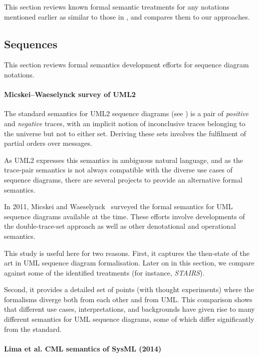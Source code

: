 
This section reviews known formal semantic treatments for any notations
mentioned earlier as similar to those in \langname, and compares them to
our approaches.

\subsection{Sequences}\label{sec:semantics-comparison-review-seq}

This section reviews formal semantics development efforts for sequence diagram
notations.

\paragraph{Micskei--Waeselynck survey of UML2}

The standard semantics for UML2 sequence diagrams (see
\cite[\S 17.2.3.1]{uml251}) is a pair of \emph{positive} and \emph{negative}
traces, with an implicit notion of inconclusive traces belonging to
the universe but not to either set.  Deriving these sets involves the
fulfilment of partial orders over messages.

As UML2 expresses this
semantics in ambiguous natural language, and as the trace-pair
semantics is not always compatible with the diverse use cases of sequence
diagrams, there are several projects to provide an alternative formal semantics.

In 2011, Micskei and Waeselynck~\cite{Micskei11-UMLSeqSemaSurvey} surveyed
the formal semantics for UML sequence diagrams available at the time.  These
efforts involve developments of the double-trace-set approach as well as other
denotational and operational semantics.

This study is useful here for two reasons.  First, it captures the then-state of
the art in UML sequence diagram formalisation.  Later on in this section,
we compare against some of the identified treatments (for instance,
\emph{STAIRS}).

Second, it provides a detailed
set of points (with thought experiments) where the formalisms diverge both from
each other and from UML.
This comparison shows that different use cases, interpretations, and backgrounds
have given rise to many different semantics for UML sequence diagrams, some
of which differ significantly from the standard.

\paragraph{Lima et al. CML semantics of SysML (2014)}

